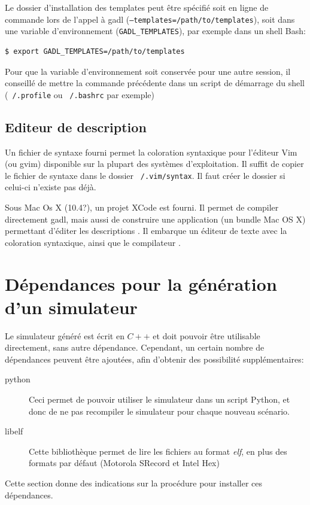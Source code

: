 Le dossier d'installation des templates peut être spécifié soit en ligne de commande lors de l'appel à gadl (\texttt{--templates=/path/to/templates}), soit dans une variable d'environnement (\texttt{GADL\_TEMPLATES}), par exemple dans un shell Bash:
\begin{verbatim}
$ export GADL_TEMPLATES=/path/to/templates
\end{verbatim}
Pour que la variable d'environnement soit conservée pour une autre session, il conseillé de mettre la commande précédente dans un script de démarrage du shell (\texttt{~/.profile} ou \texttt{~/.bashrc} par exemple)

\subsection{Editeur de description}
Un fichier de syntaxe fourni permet la coloration syntaxique pour l'éditeur Vim (ou gvim) disponible sur la plupart des systèmes d'exploitation. Il suffit de copier le fichier de syntaxe dans le dossier \texttt{~/.vim/syntax}. Il faut créer le dossier si celui-ci n'existe pas déjà.

Sous Mac Os X (10.4?), un projet XCode est fourni. Il permet de compiler directement gadl, mais aussi de construire une application (un bundle Mac OS X) permettant d'éditer les descriptions \harmless. Il embarque un éditeur de texte avec la coloration syntaxique, ainsi que le compilateur \gadl.


\section{Dépendances pour la génération d'un simulateur}

Le simulateur généré est écrit en $C++$ et doit pouvoir être utilisable directement, sans autre dépendance. Cependant, un certain nombre de dépendances peuvent être ajoutées, afin d'obtenir des possibilité supplémentaires:
\begin{description}
\item[python] Ceci permet de pouvoir utiliser le simulateur dans un script Python, et donc de ne pas recompiler le simulateur pour chaque nouveau scénario.
\item[libelf] Cette bibliothèque permet de lire les fichiers au format \emph{elf}, en plus des formats par défaut (Motorola SRecord et Intel Hex)
\end{description}

Cette section donne des indications sur la procédure pour installer ces dépendances.

